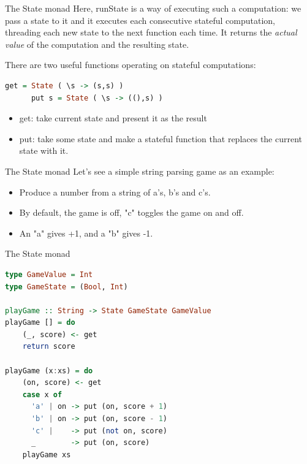 \documentclass{beamer}
\begin{document}
\begin{frame}[fragile]{The State monad}
    Here, runState is a way of executing such a computation: we pass a
    state to it and it executes each consecutive stateful computation,
    threading each new state to the next function each time. It returns
    the \textit{actual value} of the computation and the resulting state.

    \bigbreak
    There are two useful functions operating on stateful computations:

    \begin{minipage}{\linewidth} \hspace{1cm}
    \begin{lstlisting}[language=haskell, numbers=none, frame=none]
      get = State ( \s -> (s,s) )
      put s = State ( \s -> ((),s) )
    \end{lstlisting}
    \end{minipage} \hspace{1cm}

    \begin{itemize}
        \item get: take current state and present it as the result
        \item put: take some state and make a stateful function that
              replaces the current state with it.
    \end{itemize}
\end{frame}

\begin{frame}[fragile]{The State monad}
    Let's see a simple string parsing game as an example:

    \bigbreak
    \begin{itemize}
        \item Produce a number from a string of a's, b's and c's.
        \item By default, the game is off, "c" toggles the game on and off.
        \item An "a" gives +1, and a "b" gives -1.
    \end{itemize}
\end{frame}

\begin{frame}[fragile]{The State monad}
    \begin{minipage}{\linewidth} \hspace{1cm}
    \begin{lstlisting}[language=haskell, numbers=none, frame=none]
type GameValue = Int
type GameState = (Bool, Int)

playGame :: String -> State GameState GameValue
playGame [] = do
    (_, score) <- get
    return score

playGame (x:xs) = do
    (on, score) <- get
    case x of
      'a' | on -> put (on, score + 1)
      'b' | on -> put (on, score - 1)
      'c' |    -> put (not on, score)
      _        -> put (on, score)
    playGame xs
    \end{lstlisting}
    \end{minipage} \hspace{1cm}
\end{frame}
\end{document}
